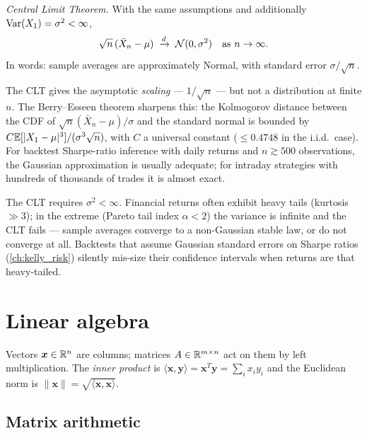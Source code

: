 \emph{Central Limit Theorem.} With the same assumptions and additionally
$\operatorname{Var}(X_1) = \sigma^2 < \infty$,
\[
\sqrt{n}\,(\bar X_n - \mu) \;\xrightarrow{d}\; \mathcal{N}(0, \sigma^2)
\quad \text{as } n \to \infty.
\]
In words: sample averages are approximately Normal, with standard error
$\sigma / \sqrt{n}$.

\begin{keyfactbox}
The CLT gives the asymptotic \emph{scaling} --- $1/\sqrt{n}$ --- but not
a distribution at finite $n$. The Berry--Esseen theorem sharpens this:
the Kolmogorov distance between the CDF of $\sqrt{n}(\bar X_n - \mu)/\sigma$
and the standard normal is bounded by $C \mathbb{E}[|X_1 - \mu|^3]/(\sigma^3 \sqrt{n})$,
with $C$ a universal constant (${\le 0.4748}$ in the i.i.d.\ case).
For backtest Sharpe-ratio inference with daily returns and $n \gtrsim 500$
observations, the Gaussian approximation is usually adequate; for
intraday strategies with hundreds of thousands of trades it is almost
exact.
\end{keyfactbox}

\begin{pitfallbox}
The CLT requires $\sigma^2 < \infty$. Financial returns often exhibit
heavy tails (kurtosis $\gg 3$); in the extreme (Pareto tail index
$\alpha < 2$) the variance is infinite and the CLT fails --- sample
averages converge to a non-Gaussian stable law, or do not converge at
all. Backtests that assume Gaussian standard errors on Sharpe ratios
(\cref{ch:kelly_risk}) silently mis-size their confidence intervals
when returns are that heavy-tailed.
\end{pitfallbox}

\section{Linear algebra}
\label{sec:app_math_linalg}

Vectors $\bm{x} \in \mathbb{R}^n$ are columns; matrices $A \in \mathbb{R}^{m\times n}$
act on them by left multiplication. The \emph{inner product} is
$\langle \bm{x}, \bm{y}\rangle = \bm{x}^T \bm{y} = \sum_i x_i y_i$ and
the Euclidean norm is $\|\bm{x}\| = \sqrt{\langle \bm{x},\bm{x}\rangle}$.

\subsection{Matrix arithmetic}

